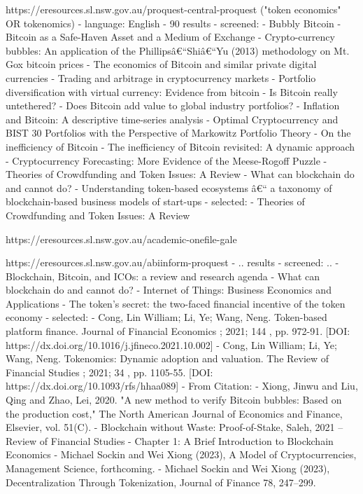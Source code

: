 \documentclass[11pt]{article}
\begin{document}
https://eresources.sl.nsw.gov.au/proquest-central-proquest
 ("token economics" OR tokenomics) 
 - language: English
 - 90 results
 - screened: 
   - Bubbly Bitcoin
   - Bitcoin as a Safe-Haven Asset and a Medium of Exchange
   - Crypto-currency bubbles: An application of the Phillipsâ€“Shiâ€“Yu (2013) methodology on Mt. Gox bitcoin prices
   - The economics of Bitcoin and similar private digital currencies
   - Trading and arbitrage in cryptocurrency markets
   - Portfolio diversification with virtual currency: Evidence from bitcoin
   - Is Bitcoin really untethered?
   - Does Bitcoin add value to global industry portfolios?
   - Inflation and Bitcoin: A descriptive time-series analysis
   - Optimal Cryptocurrency and BIST 30 Portfolios with the Perspective of Markowitz Portfolio Theory
   - On the inefficiency of Bitcoin
   - The inefficiency of Bitcoin revisited: A dynamic approach
   - Cryptocurrency Forecasting: More Evidence of the Meese-Rogoff Puzzle
   - Theories of Crowdfunding and Token Issues: A Review
   - What can blockchain do and cannot do?
   - Understanding token-based ecosystems â€“ a taxonomy of blockchain-based business models of start-ups
 - selected: 
  - Theories of Crowdfunding and Token Issues: A Review
  
https://eresources.sl.nsw.gov.au/academic-onefile-gale

https://eresources.sl.nsw.gov.au/abiinform-proquest
 - .. results
   - screened: ..
     - Blockchain, Bitcoin, and ICOs: a review and research agenda
     - What can blockchain do and cannot do?
     - Internet of Things: Business Economics and Applications
     - The token's secret: the two-faced financial incentive of the token economy
- selected: 
     - Cong, Lin William; Li, Ye; Wang, Neng. Token-based platform finance. Journal of Financial Economics ; 2021; 144 , pp. 972-91. [DOI: https://dx.doi.org/10.1016/j.jfineco.2021.10.002]
     - Cong, Lin William; Li, Ye; Wang, Neng. Tokenomics: Dynamic adoption and valuation. The Review of Financial Studies ; 2021; 34 , pp. 1105-55. [DOI: https://dx.doi.org/10.1093/rfs/hhaa089]
- From Citation:
  - Xiong, Jinwu and Liu, Qing and Zhao, Lei, 2020. "A new method to verify Bitcoin bubbles: Based on the production cost," The North American Journal of Economics and Finance, Elsevier, vol. 51(C). 
  - Blockchain without Waste: Proof-of-Stake, Saleh, 2021 – Review of Financial Studies
  - Chapter 1: A Brief Introduction to Blockchain Economics
  - Michael Sockin and Wei Xiong (2023), A Model of Cryptocurrencies, Management Science, forthcoming.
  - Michael Sockin and Wei Xiong (2023), Decentralization Through Tokenization, Journal of Finance 78, 247–299.  
  
\end{document}
